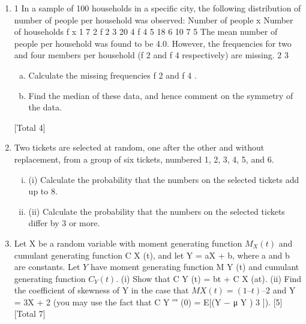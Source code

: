 \documentclass[a4paper,12pt]{article}
\begin{document}
\begin{enumerate}
\item 1
In a sample of 100 households in a specific city, the following distribution of number of people per household was observed:
Number of people x
Number of households f x
1
7
2
f 2
3
20
4
f 4
5
18
6
10
7
5
The mean number of people per household was found to be 4.0. However, the
frequencies for two and four members per household (f 2 and f 4 respectively) are
missing.
2
3

\begin{enumerate}[(a)]
\item Calculate the missing frequencies f 2 and f 4 .
\item Find the median of these data, and hence comment on the symmetry of the
data.
\end{enumerate}
[Total 4]
\item Two tickets are selected at random, one after the other and without replacement, from a group of six tickets, numbered 1, 2, 3, 4, 5, and 6.
\begin{enumerate}[(i)]
\item (i) Calculate the probability that the numbers on the selected tickets add up to 8.
\item 
(ii) Calculate the probability that the numbers on the selected tickets differ by
3 or more.
\end{enumerate}
\item Let X be a random variable with moment generating function $M_X (t)$ and cumulant generating function C X (t), and let Y = aX + b, where a and b are constants. Let $Y$ have moment generating function M Y (t) and cumulant generating function $C_Y (t)$.
(i) Show that C Y (t) = bt + C X (at).
(ii) Find the coefficient of skewness of Y in the case that $M X (t) = (1 – t) –2$ and
Y = 3X + 2 (you may use the fact that C Y ′′′ (0) = E[(Y − μ Y ) 3 ]).
[5]
[Total 7]



\end{enumerate}
\end{document}
